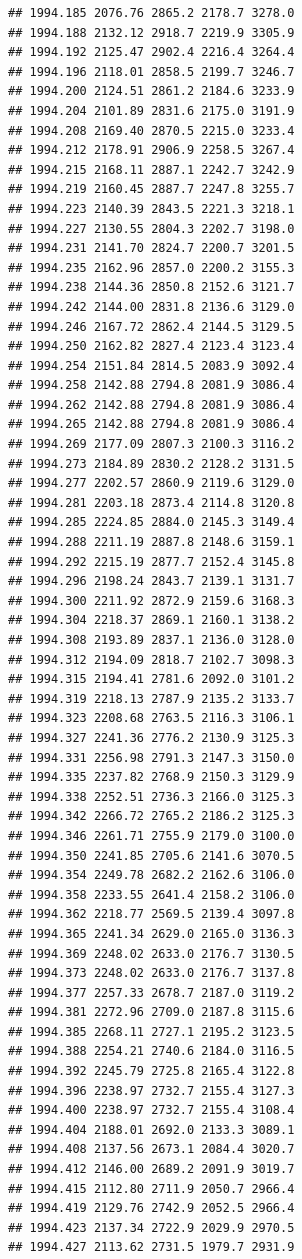 \documentclass[
]{book}
\begin{document}
\begin{verbatim}
## 1994.185 2076.76 2865.2 2178.7 3278.0
## 1994.188 2132.12 2918.7 2219.9 3305.9
## 1994.192 2125.47 2902.4 2216.4 3264.4
## 1994.196 2118.01 2858.5 2199.7 3246.7
## 1994.200 2124.51 2861.2 2184.6 3233.9
## 1994.204 2101.89 2831.6 2175.0 3191.9
## 1994.208 2169.40 2870.5 2215.0 3233.4
## 1994.212 2178.91 2906.9 2258.5 3267.4
## 1994.215 2168.11 2887.1 2242.7 3242.9
## 1994.219 2160.45 2887.7 2247.8 3255.7
## 1994.223 2140.39 2843.5 2221.3 3218.1
## 1994.227 2130.55 2804.3 2202.7 3198.0
## 1994.231 2141.70 2824.7 2200.7 3201.5
## 1994.235 2162.96 2857.0 2200.2 3155.3
## 1994.238 2144.36 2850.8 2152.6 3121.7
## 1994.242 2144.00 2831.8 2136.6 3129.0
## 1994.246 2167.72 2862.4 2144.5 3129.5
## 1994.250 2162.82 2827.4 2123.4 3123.4
## 1994.254 2151.84 2814.5 2083.9 3092.4
## 1994.258 2142.88 2794.8 2081.9 3086.4
## 1994.262 2142.88 2794.8 2081.9 3086.4
## 1994.265 2142.88 2794.8 2081.9 3086.4
## 1994.269 2177.09 2807.3 2100.3 3116.2
## 1994.273 2184.89 2830.2 2128.2 3131.5
## 1994.277 2202.57 2860.9 2119.6 3129.0
## 1994.281 2203.18 2873.4 2114.8 3120.8
## 1994.285 2224.85 2884.0 2145.3 3149.4
## 1994.288 2211.19 2887.8 2148.6 3159.1
## 1994.292 2215.19 2877.7 2152.4 3145.8
## 1994.296 2198.24 2843.7 2139.1 3131.7
## 1994.300 2211.92 2872.9 2159.6 3168.3
## 1994.304 2218.37 2869.1 2160.1 3138.2
## 1994.308 2193.89 2837.1 2136.0 3128.0
## 1994.312 2194.09 2818.7 2102.7 3098.3
## 1994.315 2194.41 2781.6 2092.0 3101.2
## 1994.319 2218.13 2787.9 2135.2 3133.7
## 1994.323 2208.68 2763.5 2116.3 3106.1
## 1994.327 2241.36 2776.2 2130.9 3125.3
## 1994.331 2256.98 2791.3 2147.3 3150.0
## 1994.335 2237.82 2768.9 2150.3 3129.9
## 1994.338 2252.51 2736.3 2166.0 3125.3
## 1994.342 2266.72 2765.2 2186.2 3125.3
## 1994.346 2261.71 2755.9 2179.0 3100.0
## 1994.350 2241.85 2705.6 2141.6 3070.5
## 1994.354 2249.78 2682.2 2162.6 3106.0
## 1994.358 2233.55 2641.4 2158.2 3106.0
## 1994.362 2218.77 2569.5 2139.4 3097.8
## 1994.365 2241.34 2629.0 2165.0 3136.3
## 1994.369 2248.02 2633.0 2176.7 3130.5
## 1994.373 2248.02 2633.0 2176.7 3137.8
## 1994.377 2257.33 2678.7 2187.0 3119.2
## 1994.381 2272.96 2709.0 2187.8 3115.6
## 1994.385 2268.11 2727.1 2195.2 3123.5
## 1994.388 2254.21 2740.6 2184.0 3116.5
## 1994.392 2245.79 2725.8 2165.4 3122.8
## 1994.396 2238.97 2732.7 2155.4 3127.3
## 1994.400 2238.97 2732.7 2155.4 3108.4
## 1994.404 2188.01 2692.0 2133.3 3089.1
## 1994.408 2137.56 2673.1 2084.4 3020.7
## 1994.412 2146.00 2689.2 2091.9 3019.7
## 1994.415 2112.80 2711.9 2050.7 2966.4
## 1994.419 2129.76 2742.9 2052.5 2966.4
## 1994.423 2137.34 2722.9 2029.9 2970.5
## 1994.427 2113.62 2731.5 1979.7 2931.9

\end{verbatim}
\end{document}
